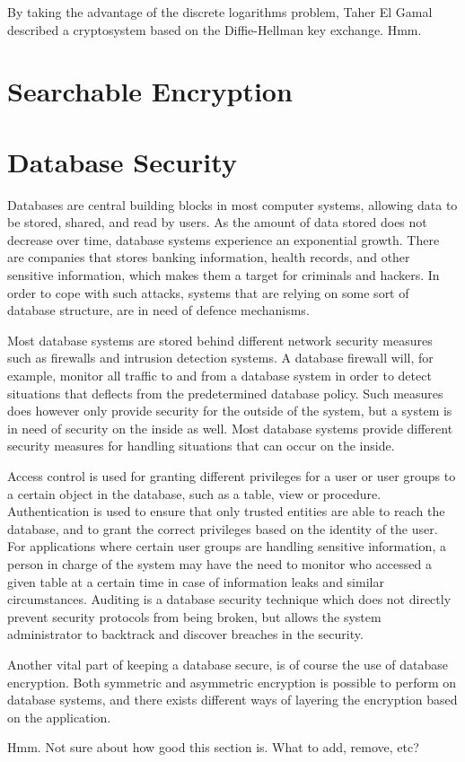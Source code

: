 By taking the advantage of the discrete logarithms problem, Taher El Gamal described a cryptosystem \cite{elgamal} based on the Diffie-Hellman key exchange. Hmm.

\section{Searchable Encryption}

\section{Database Security}
\label{chp:database_Security}

Databases are central building blocks in most computer systems, allowing data to be stored, shared, and read by users. As the amount of data stored does not decrease over time, database systems experience an exponential growth. There are companies that stores banking information, health records, and other sensitive information, which makes them a target for criminals and hackers. In order to cope with such attacks, systems that are relying on some sort of database structure, are in need of defence mechanisms. 


Most database systems are stored behind different network security measures such as firewalls and intrusion detection systems. A database firewall will, for example, monitor all traffic to and from a database system in order to detect situations that deflects from the predetermined database policy. Such measures does however only provide security for the outside of the system, but a system is in need of security on the inside as well. Most database systems provide different security measures for handling situations that can occur on the inside.

Access control is used for granting different privileges for a user or user groups to a certain object in the database, such as a table, view or procedure. Authentication is used to ensure that only trusted entities are able to reach the database, and to grant the correct privileges based on the identity of the user. For applications where certain user groups are handling sensitive information, a person in charge of the system may have the need to monitor who accessed a given table at a certain time in case of information leaks and similar circumstances. Auditing is a database security technique which does not directly prevent security protocols from being broken, but allows the system administrator to backtrack and discover breaches in the security.

Another vital part of keeping a database secure, is of course the use of database encryption. Both symmetric and asymmetric encryption is possible to perform on database systems, and there exists different ways of layering the encryption based on the application.


Hmm. Not sure about how good this section is. What to add, remove, etc?